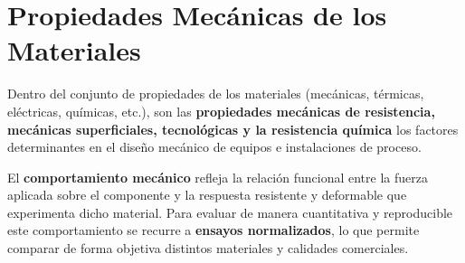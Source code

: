 \section{Propiedades Mecánicas de los Materiales}

Dentro del conjunto de propiedades de los materiales (mecánicas, térmicas, eléctricas, químicas, etc.), son las \textbf{propiedades mecánicas de resistencia, mecánicas superficiales, tecnológicas y la resistencia química} los factores determinantes en el diseño mecánico de equipos e instalaciones de proceso.

El \textbf{comportamiento mecánico} refleja la relación funcional entre la fuerza aplicada sobre el componente y la respuesta resistente y deformable que experimenta dicho material. Para evaluar de manera cuantitativa y reproducible este comportamiento se recurre a \textbf{ensayos normalizados}, lo que permite comparar de forma objetiva distintos materiales y calidades comerciales.


